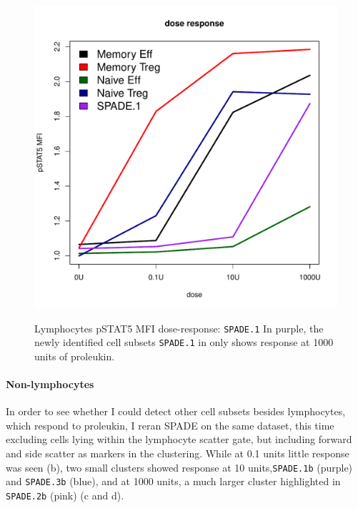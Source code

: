 \begin{figure}
\begin{minipage}{.5\textwidth}
  \includegraphics[scale=0.4]{figures/spade-lymphocytes-dose-response}
\end{minipage}
\begin{minipage}{.3\textwidth}
{ Lymphocytes pSTAT5 MFI dose-response: \texttt{SPADE.1} }
{
In purple, the newly identified cell subsets \texttt{SPADE.1} in  only shows response at 1000 units of proleukin. 
}
\end{minipage}
\end{figure}

\clearpage

\paragraph{Non-lymphocytes}

In order to see whether I could detect other cell subsets besides lymphocytes, which respond to proleukin, I reran \gls{SPADE} on the same dataset, this time excluding cells lying within the lymphocyte scatter gate, but including forward and side scatter as markers in the clustering.
While at 0.1 units little response was seen (b), two small clusters showed response at 10 units,\texttt{SPADE.1b} (purple) and \texttt{SPADE.3b} (blue), and at 1000 units, a much larger cluster highlighted in \texttt{SPADE.2b} (pink) (c and d).

